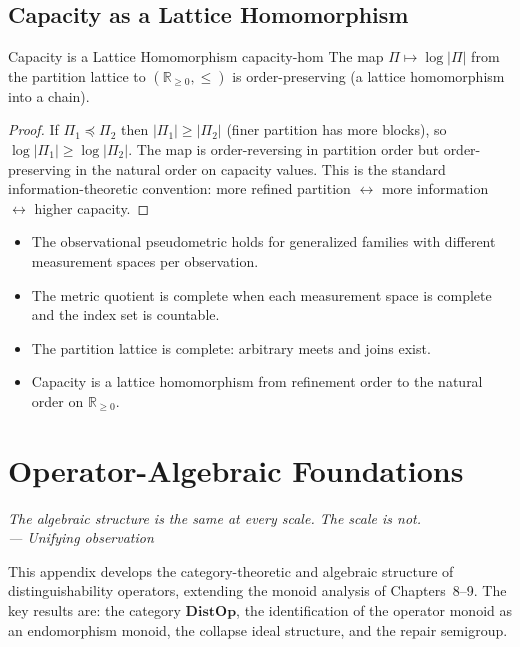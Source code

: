 \documentclass[12pt,twoside,openright]{book}
\newenvironment{epigraph}[2]{%
  \vspace{1em}\begin{flushright}
  \begin{minipage}{0.72\textwidth}
  \itshape\small #1\\[0.4em]
  \upshape\footnotesize\sffamily\color{DistGray}--- #2
  \end{minipage}\end{flushright}\vspace{1.5em}}{}
\newenvironment{appsummary}{%
  \begin{tcolorbox}[colback=DistBlue!5,colframe=DistBlue,
    title={\faBookOpen\enspace Appendix Summary},
    fonttitle=\sffamily\bfseries\color{white},
    attach boxed title to top left={yshift=-2mm,xshift=4mm},
    boxed title style={colback=DistBlue,rounded corners}]
  \begin{itemize}[nosep,leftmargin=*]}{%
  \end{itemize}\end{tcolorbox}}
\providecommand{\catDistOp}{\mathbf{DistOp}}
\begin{document}
\section{Capacity as a Lattice Homomorphism}

\begin{proposition}{Capacity is a Lattice Homomorphism}%
  {capacity-hom}
The map $\Pi\mapsto\log|\Pi|$ from the partition lattice to
$(\mathbb{R}_{\ge0},\le)$ is order-preserving (a lattice
homomorphism into a chain).
\begin{proof}
If $\Pi_1\preceq\Pi_2$ then $|\Pi_1|\ge|\Pi_2|$ (finer
partition has more blocks), so $\log|\Pi_1|\ge\log|\Pi_2|$.
The map is order-reversing in partition order but
order-preserving in the natural order on capacity values.
This is the standard information-theoretic convention:
more refined partition $\leftrightarrow$ more information
$\leftrightarrow$ higher capacity.
\end{proof}
\end{proposition}

\begin{appsummary}
\item The observational pseudometric holds for generalized
  families with different measurement spaces per observation.
\item The metric quotient is complete when each measurement
  space is complete and the index set is countable.
\item The partition lattice is complete: arbitrary meets and
  joins exist.
\item Capacity is a lattice homomorphism from refinement order
  to the natural order on $\mathbb{R}_{\ge0}$.
\end{appsummary}


\chapter{Operator-Algebraic Foundations}
\label{app:operator-algebra}

\begin{epigraph}{The algebraic structure is the same at every
  scale. The scale is not.}{Unifying observation}
\end{epigraph}

This appendix develops the category-theoretic and algebraic
structure of distinguishability operators, extending the monoid
analysis of Chapters~8--9. The key results are: the category
$\catDistOp$, the identification of the operator monoid as an
endomorphism monoid, the collapse ideal structure, and the
repair semigroup.
\end{document}
